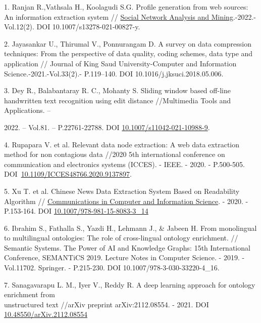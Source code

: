 \begin{references}
1. Ranjan R.,Vathsala H., Koolagudi S.G. Profile generation from web
sources: An information extraction system //
\href{https://link.springer.com/journal/13278}{Social Network Analysis
and Mining}.-2022.-Vol.12(2). DOI 10.1007/s13278-021-00827-y.

2. Jayasankar U., Thirumal V., Ponnurangam D. A survey on data
compression techniques: From the perspective of data quality, coding
schemes, data type and application // Journal of King Saud
University-Computer and Information Science.-2021.-Vol.33(2).-
P.119--140. DOI 10.1016/j.jksuci.2018.05.006.

3. Dey R., Balabantaray R. C., Mohanty S. Sliding window based off-line
handwritten text recognition using edit distance //Multimedia Tools and
Applications. --

2022. -- Vol.81. -- P.22761-22788. DOI
\href{https://link.springer.com/article/10.1007/s11042-021-10988-9}{10.1007/s11042-021-10988-9}.

4. Rupapara V. et al. Relevant data node extraction: A web data
extraction method for non contagious data //2020 5th international
conference on communication and electronics systems (ICCES). - IEEE. -
2020. - P.500-505.
DOI~\href{https://doi.org/10.1109/ICCES48766.2020.9137897}{10.1109/ICCES48766.2020.9137897}.

5. Xu T. et al. Chinese News Data Extraction System Based on Readability
Algorithm //
\href{https://www.researchgate.net/journal/Communications-in-Computer-and-Information-Science-1865-0929?_tp=eyJjb250ZXh0Ijp7ImZpcnN0UGFnZSI6InB1YmxpY2F0aW9uIiwicGFnZSI6InB1YmxpY2F0aW9uIn19}{Communications
in Computer and Information Science}. - 2020. - P.153-164. DOI
\href{http://dx.doi.org/10.1007/978-981-15-8083-3_14}{10.1007/978-981-15-8083-3\_14}

6. Ibrahim S., Fathalla S., Yazdi H., Lehmann J., \& Jabeen H. From
monolingual to multilingual ontologies: The role of cross-lingual
ontology enrichment. // Semantic Systems. The Power of AI and Knowledge
Graphs: 15th International Conference, SEMANTiCS 2019. Lecture Notes in
Computer Science. - 2019. -Vol.11702. Springer. - P.215-230. DOI
10.1007/978-3-030-33220-4\_16.

7. Sanagavarapu L. M., Iyer V., Reddy R. A deep learning approach for
ontology enrichment from \\unstructured text //arXiv preprint
arXiv:2112.08554. - 2021. DOI
\href{http://dx.doi.org/10.48550/arXiv.2112.08554}{10.48550/arXiv.2112.08554}


\end{references}
